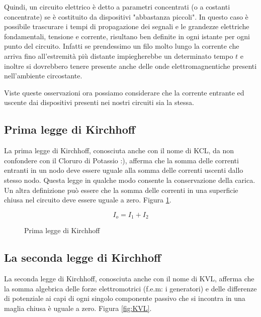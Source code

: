 Quindi, un circuito elettrico è detto a parametri concentrati (o a costanti concentrate) se è costituito da dispositivi "abbastanza piccoli".
In questo caso è possibile trascurare i tempi di propagazione dei segnali e le grandezze elettriche fondamentali, tensione e corrente, risultano ben definite in ogni istante per ogni punto del circuito.
Infatti se prendessimo un filo molto lungo la corrente che arriva fino all'estremità più distante impiegherebbe un determinato tempo $t$ e inoltre si dovrebbero tenere presente anche delle onde elettromagnentiche presenti nell'ambiente circostante.

Viste queste osservazioni ora possiamo considerare che la corrente entrante ed uscente dai dispositivi presenti nei nostri circuiti sia la stessa.

\subsection{Prima legge di Kirchhoff}
La prima legge di Kirchhoff, conosciuta anche con il nome di KCL, da non confondere con il Cloruro di Potassio :), afferma che la somma delle correnti entranti in un nodo deve essere uguale alla somma delle correnti uscenti dallo stesso nodo. Questa legge in qualche modo consente la conservazione della carica.
Un altra definizione può essere che la somma delle correnti in una superficie chiusa nel circuito deve essere uguale a zero. Figura \ref{fig:KCL}.

\begin{equation}
    I_o = I_1 + I_2
\end{equation}

\begin{figure}[H]
    \centering
    \caption{Prima legge di Kirchhoff}
    \label{fig:KCL}
\end{figure}

\subsection{La seconda legge di Kirchhoff}
La seconda legge di Kirchhoff, conosciuta anche con il nome di KVL, afferma che la somma algebrica delle forze elettromotrici (f.e.m: i generatori) e delle differenze di potenziale ai capi di ogni singolo componente passivo che si incontra in una maglia chiusa è uguale a zero.
Figura \ref{fig:KVL}.

